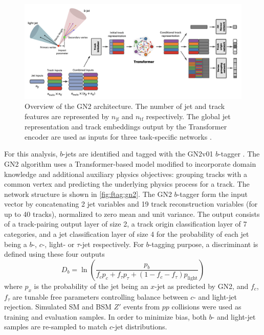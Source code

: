 \documentclass[../thesis.tex]{subfiles}
\begin{document}
\begin{figure}[!htbp]
\begin{center}
\includegraphics[width=\linewidth]{fig/reco_ftag_gn2.png}
\caption[Overview of the GN2 architecture. The number of jet and track features are represented by $n_\text{jf}$ and $n_\text{tf}$ respectively. The global jet representation and track embeddings output by the Transformer encoder are used as inputs for three task-specific networks.]{\label{fig:ftag:gn2}Overview of the GN2 architecture. The number of jet and track features are represented by $n_\text{jf}$ and $n_\text{tf}$ respectively. The global jet representation and track embeddings output by the Transformer encoder are used as inputs for three task-specific networks \citep{ftag:gn2}.}
\end{center}
\end{figure}
For this analysis, $b$-jets are identified and tagged with the GN2v01 $b$-tagger \citep{ftag:gn2}. The GN2 algorithm uses a Transformer-based model \citep{ftag:transformer} modified to incorporate domain knowledge and additional auxiliary physics objectives: grouping tracks with a common vertex and predicting the underlying physics process for a track. The network structure is shown in \autoref{fig:ftag:gn2}. The GN2 $b$-tagger form the input vector by concatenating 2 jet variables and 19 track reconstruction variables (for up to 40 tracks), normalized to zero mean and unit variance. The output consists of a track-pairing output layer of size 2, a track origin classification layer of 7 categories, and a jet classification layer of size 4 for the probability of each jet being a $b$-, $c$-, light- or $\tau$-jet respectively. For $b$-tagging purpose, a discriminant is defined using these four outputs
\begin{equation}
D_b = \ln \left( \displaystyle\frac{p_b}{f_c p_c + f_\tau p_\tau + (1-f_c-f_\tau) p_\text{light}} \right)
\end{equation}
where $p_x$ is the probability of the jet being an $x$-jet as predicted by GN2, and $f_c$, $f_\tau$ are tunable free parameters controlling balance between $c$- and light-jet rejection. Simulated \acs{SM} \ttbar and \acs{BSM} $Z'$ events from $pp$ collisions were used as training and evaluation samples. In order to minimize bias, both $b$- and light-jet samples are re-sampled to match $c$-jet distributions. 
\end{document}
